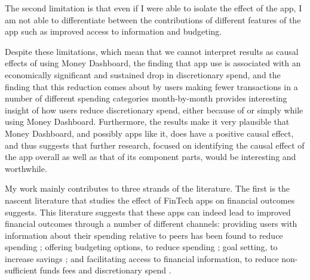 The second limitation is that even if I were able to isolate the effect of
the app, I am not able to differentiate between the contributions of different
features of the app such as improved access to information and budgeting.

Despite these limitations, which mean that we cannot interpret results as
causal effects of using Money Dashboard, the finding that app use is associated
with an economically significant and sustained drop in discretionary spend, and
the finding that this reduction comes about by users making fewer transactions
in a number of different spending categories month-by-month provides
interesting insight of how users reduce discretionary spend, either because of
or simply while using Money Dashboard. Furthermore, the results make it very
plausible that Money Dashboard, and possibly apps like it, does have a
positive causal effect, and thus suggests that further research, focused on
identifying the causal effect of the app overall as well as that of its
component parts, would be interesting and worthwhile.

My work mainly contributes to three strands of the literature. The first is the
nascent literature that studies the effect of FinTech apps on financial
outcomes suggests. This literature suggests that these apps can indeed lead to
improved financial outcomes through a number of different channels: providing
users with information about their spending relative to peers has been found to
reduce spending \citep{dacunto2020crowdsourcing}; offering budgeting options,
to reduce spending \citep{lukas2022influence}; goal setting, to increase
savings \citep{gargano2021goal}; and facilitating access to financial
information, to reduce non-sufficient funds fees \citep{carlin2022mobile} and
discretionary spend \citep{levi2020mind}.

